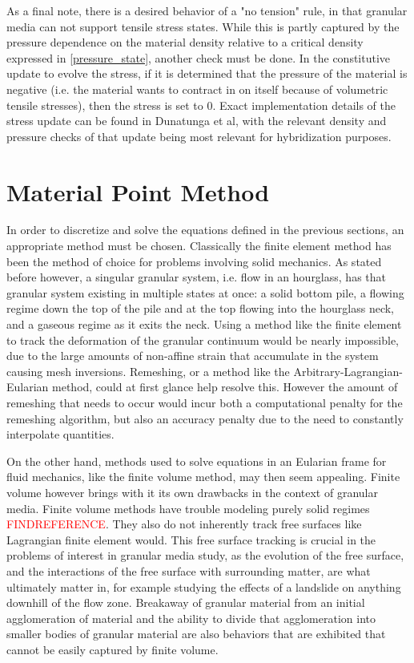 As a final note, there is a desired behavior of a "no tension" rule, in that granular media can not support tensile stress states. While this is partly captured by the pressure dependence on the material density relative to a critical density expressed in \ref{pressure_state}, another check must be done. In the constitutive update to evolve the stress, if it is determined that the pressure of the material is negative (i.e. the material wants to contract in on itself because of volumetric tensile stresses), then the stress is set to 0. Exact implementation details of the stress update can be found in Dunatunga et al, with the relevant density and pressure checks of that update being most relevant for hybridization purposes. 

\section{Material Point Method}
In order to discretize and solve the equations defined in the previous sections, an appropriate method must be chosen. Classically the finite element method has been the method of choice for problems involving solid mechanics. As stated before however, a singular granular system, i.e. flow in an hourglass, has that granular system existing in multiple states at once: a solid bottom pile, a flowing regime down the top of the pile and at the top flowing into the hourglass neck, and a gaseous regime as it exits the neck. Using a method like the finite element to track the deformation of the granular continuum would be nearly impossible, due to the large amounts of non-affine strain that accumulate in the system causing mesh inversions. Remeshing, or a method like the Arbitrary-Lagrangian-Eularian method, could at first glance help resolve this. However the amount of remeshing that needs to occur would incur both a computational penalty for the remeshing algorithm, but also an accuracy penalty due to the need to constantly interpolate quantities.

On the other hand, methods used to solve equations in an Eularian frame for fluid mechanics, like the finite volume method, may then seem appealing. Finite volume however brings with it its own drawbacks in the context of granular media. Finite volume methods have trouble modeling purely solid regimes \textcolor{red}{FINDREFERENCE}. They also do not inherently track free surfaces like Lagrangian finite element would. This free surface tracking is crucial in the problems of interest in granular media study, as the evolution of the free surface, and the interactions of the free surface with surrounding matter, are what ultimately matter in, for example studying the effects of a landslide on anything downhill of the flow zone. Breakaway of granular material from an initial agglomeration of material and the ability to divide that agglomeration into smaller bodies of granular material are also behaviors that are exhibited that cannot be easily captured by finite volume.


